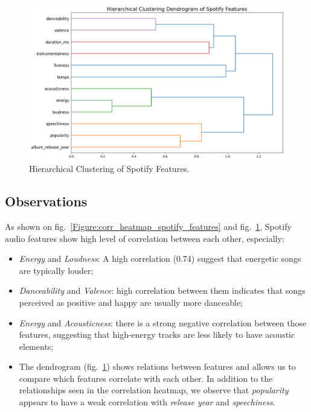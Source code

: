 \begin{center}
\begin{figure}[H]
  \centering
  \includegraphics[width=6in]{img/dendrogram_spotify_features.png}
  \caption{Hierarchical Clustering of Spotify Features.}
  \label{Figure:dendrogram_spotify_features}
\end{figure}
\end{center}

\subsection*{Observations}
As shown on fig.~\ref{Figure:corr_heatmap_spotify_features} and
fig.~\ref{Figure:dendrogram_spotify_features}, Spotify audio features show high
level of correlation between each other, especially:
\begin{itemize}
  \item \textit{Energy} and \textit{Loudness}: A high correlation (0.74) suggest
    that energetic songs are typically louder;
  \item \textit{Danceability} and \textit{Valence}: high correlation between
    them indicates that songs perceived as positive and happy are usually more
    danceable;
  \item \textit{Energy} and \textit{Acousticness}: there is a strong negative
    correlation between those features, suggesting that high-energy tracks are
    less likely to have acoustic elements;
  \item The dendrogram (fig.~\ref{Figure:dendrogram_spotify_features}) shows relations
    between features and allows us to compare which features correlate with
    each other. In addition to the relationships seen in the correlation
    heatmap, we observe that \textit{popularity} appears to have a weak
    correlation with \textit{release year} and \textit{speechiness}.

\end{itemize}


